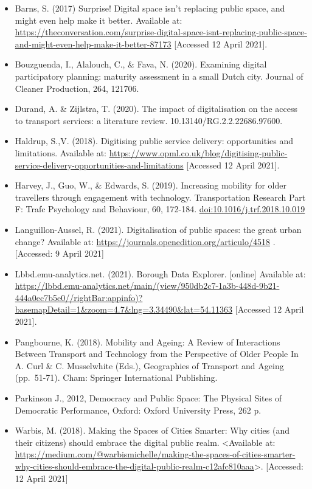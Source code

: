 \documentclass[
]{book}
\providecommand{\tightlist}{%
  \setlength{\itemsep}{0pt}\setlength{\parskip}{0pt}}
\begin{document}
\begin{itemize}
\tightlist
\item
  Barns, S. (2017) Surprise! Digital space isn't replacing public space, and might even help make it better. Available at: \url{https://theconversation.com/surprise-digital-space-isnt-replacing-public-space-and-might-even-help-make-it-better-87173} {[}Accessed 12 April 2021{]}.
\item
  Bouzguenda, I., Alalouch, C., \& Fava, N. (2020). Examining digital participatory planning: maturity assessment in a small Dutch city. Journal of Cleaner Production, 264, 121706.
\item
  Durand, A. \& Zijlstra, T. (2020). The impact of digitalisation on the access to transport services: a literature review. 10.13140/RG.2.2.22686.97600.
\item
  Haldrup, S.,V. (2018). Digitising public service delivery: opportunities and limitations. Available at: \url{https://www.opml.co.uk/blog/digitising-public-service-delivery-opportunities-and-limitations} {[}Accessed 12 April 2021{]}.
\item
  Harvey, J., Guo, W., \& Edwards, S. (2019). Increasing mobility for older travellers through engagement with technology. Transportation Research Part F: Trafc Psychology and Behaviour, 60, 172-184. \url{doi:10.1016/j.trf.2018.10.019}
\item
  Languillon-Aussel, R. (2021). Digitalisation of public spaces: the great urban change? Available at: \url{https://journals.openedition.org/articulo/4518} . {[}Accessed: 9 April 2021{]}
\item
  Lbbd.emu-analytics.net. (2021). Borough Data Explorer. {[}online{]} Available at: \url{https://lbbd.emu-analytics.net/main/(view/950db2c7-1a3b-448d-9b21-444a0ec7b5e0//rightBar:appinfo)?basemapDetail=1\&zoom=4.7\&lng=3.34490\&lat=54.11363} {[}Accessed 12 April 2021{]}.
\item
  Pangbourne, K. (2018). Mobility and Ageing: A Review of Interactions Between Transport and Technology from the Perspective of Older People In A. Curl \& C. Musselwhite (Eds.), Geographies of Transport and Ageing (pp.~51-71). Cham: Springer International Publishing.
\item
  Parkinson J., 2012, Democracy and Public Space: The Physical Sites of Democratic Performance, Oxford: Oxford University Press, 262 p.
\item
  Warbis, M. (2018). Making the Spaces of Cities Smarter: Why cities (and their citizens) should embrace the digital public realm. \textless Available at: \url{https://medium.com/@warbismichelle/making-the-spaces-of-cities-smarter-why-cities-should-embrace-the-digital-public-realm-c12afc810aaa}\textgreater. {[}Accessed: 12 April 2021{]}
\end{itemize}
\end{document}
